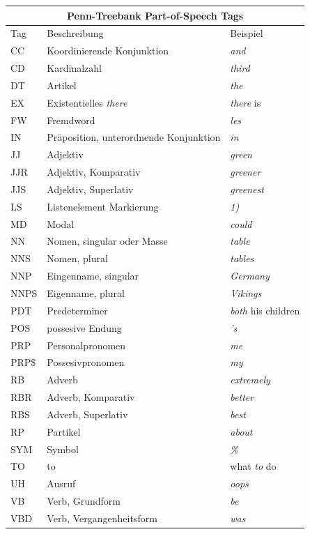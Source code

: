 \begin{table}
\begin{tabular}{ | l l l |}
	\hline
	\multicolumn{3}{|c|}{Penn-Treebank Part-of-Speech Tags} \\
	\hline
	\hline
	Tag & Beschreibung & Beispiel \\
	\hline
	CC & Koordinierende Konjunktion & \textit{and} \\
	CD & Kardinalzahl & \textit{third}\\
	DT & Artikel & \textit{the}\\
	EX & Existentielles \textit{there} & \textit{there} is\\
	FW & Fremdword & \textit{les}\\
	IN & Präposition, unterordnende Konjunktion & \textit{in}\\
	JJ & Adjektiv & \textit{green}\\
	JJR & Adjektiv, Komparativ & \textit{greener}\\
	JJS & Adjektiv, Superlativ & \textit{greenest}\\
	LS & Listenelement Markierung & \textit{1)}\\
	MD & Modal & \textit{could}\\
	NN & Nomen, singular oder Masse & \textit{table}\\
	NNS & Nomen, plural & \textit{tables}\\
	NNP & Eingenname, singular & \textit{Germany}\\
	NNPS & Eigenname, plural & \textit{Vikings}\\
	PDT & Predeterminer & \textit{both} his children \\
	POS & possesive Endung & \textit{'s} \\
	PRP & Personalpronomen & \textit{me} \\
	PRP\$ & Possesivpronomen & \textit{my} \\
	RB & Adverb & \textit{extremely} \\
	RBR & Adverb, Komparativ & \textit{better} \\
	RBS & Adverb, Superlativ & \textit{best} \\
	RP & Partikel & \textit{about} \\
	SYM & Symbol & \textit{\%} \\
	TO & to & what \textit{to} do \\
	UH & Ausruf & \textit{oops} \\
	VB & Verb, Grundform & \textit{be} \\
	VBD & Verb, Vergangenheitsform & \textit{was} \\

\end{tabular}
\end{table}
